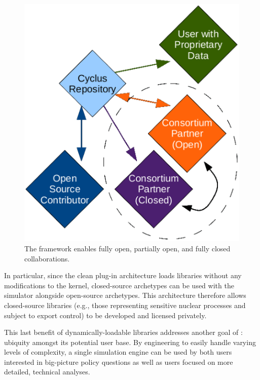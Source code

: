 \begin{figure}[htbp!]
\begin{center}
\includegraphics{./images/modifiedopen.eps}
\end{center}
\caption{The \Cyclus framework enables fully open, partially open, and fully
closed collaborations\cite{wilson_cyclus:_2012}.}
\label{fig:modifiedopen}
\end{figure}

In particular, since the clean plug-in architecture loads libraries without any
modifications to the \Cyclus kernel, closed-source archetypes can be used with
the simulator alongside open-source archetypes. This architecture therefore
allows closed-source libraries (e.g., those representing sensitive nuclear
processes and subject to export control) to be developed and licensed privately.

This last benefit of dynamically-loadable libraries addresses
another goal of \Cyclus: ubiquity amongst its potential user base. By
engineering \Cyclus to easily handle varying levels of complexity, a single
simulation engine can be used by both users interested in big-picture policy
questions as well as users focused on more detailed, technical
analyses.

